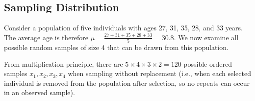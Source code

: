 \subsection{Sampling Distribution}

Consider a population of five individuals with ages 27, 31, 35, 28, and 33 years.
The average age is therefore \( \mu = \frac{27 + 31 + 35 + 28 + 33}{5} = 30.8 \).
We now examine all possible random samples of size 4 that can be drawn from this population.

From multiplication principle, there are \( 5 \times 4 \times 3 \times 2 = 120 \) possible ordered samples \( x_1, x_2, x_3, x_4 \) when sampling without replacement (i.e., when each selected individual is removed from the population after selection, so no repeats can occur in an observed sample).